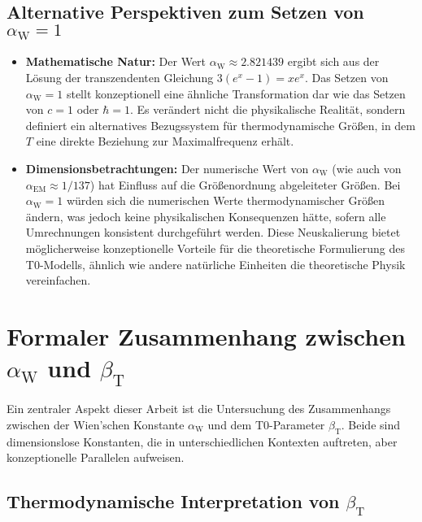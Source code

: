 \documentclass[12pt,a4paper]{article}
\newcommand{\betaT}{\beta_{\text{T}}}
\newcommand{\alphaEM}{\alpha_{\text{EM}}}
\newcommand{\alphaW}{\alpha_{\text{W}}}
\begin{document}
	\subsection{Alternative Perspektiven zum Setzen von \(\alphaW = 1\)}
	
	\begin{itemize}
		\item \textbf{Mathematische Natur:} Der Wert \(\alphaW \approx 2.821439\) ergibt sich aus der Lösung der transzendenten Gleichung \(3(e^x - 1) = xe^x\). Das Setzen von \(\alphaW = 1\) stellt konzeptionell eine ähnliche Transformation dar wie das Setzen von \(c = 1\) oder \(\hbar = 1\). Es verändert nicht die physikalische Realität, sondern definiert ein alternatives Bezugssystem für thermodynamische Größen, in dem \(T\) eine direkte Beziehung zur Maximalfrequenz erhält.
		\item \textbf{Dimensionsbetrachtungen:} Der numerische Wert von \(\alphaW\) (wie auch von \(\alphaEM \approx 1/137\)) hat Einfluss auf die Größenordnung abgeleiteter Größen. Bei \(\alphaW = 1\) würden sich die numerischen Werte thermodynamischer Größen ändern, was jedoch keine physikalischen Konsequenzen hätte, sofern alle Umrechnungen konsistent durchgeführt werden. Diese Neuskalierung bietet möglicherweise konzeptionelle Vorteile für die theoretische Formulierung des T0-Modells, ähnlich wie andere natürliche Einheiten die theoretische Physik vereinfachen.
	\end{itemize}
	
	\section{Formaler Zusammenhang zwischen \(\alphaW\) und \(\betaT\)}
	
	Ein zentraler Aspekt dieser Arbeit ist die Untersuchung des Zusammenhangs zwischen der Wien'schen Konstante \(\alphaW\) und dem T0-Parameter \(\betaT\). Beide sind dimensionslose Konstanten, die in unterschiedlichen Kontexten auftreten, aber konzeptionelle Parallelen aufweisen.
	
	\subsection{Thermodynamische Interpretation von \(\betaT\)}
	
\end{document}
